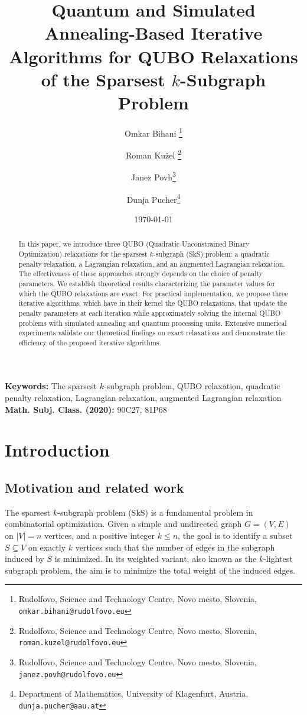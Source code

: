 \documentclass{article}
\title{Quantum and Simulated Annealing-Based Iterative Algorithms for QUBO Relaxations of the  Sparsest 
$k$-Subgraph Problem}
\author{
	{Omkar Bihani} \thanks{Rudolfovo, Science and Technology Centre, Novo mesto, Slovenia, {\tt omkar.bihani@rudolfovo.eu}}
\and
	{Roman Kužel} \thanks{Rudolfovo, Science and Technology Centre, Novo mesto, Slovenia, {\tt roman.kuzel@rudolfovo.eu}}
\and {Janez Povh}\thanks{Rudolfovo, Science and Technology Centre, Novo mesto, Slovenia, {\tt janez.povh@rudolfovo.eu}}
        \and  {Dunja Pucher}\thanks{Department of Mathematics,
		University of Klagenfurt, Austria,
		{\tt dunja.pucher@aau.at} }}
\date{\today}
\begin{document}
\maketitle



\begin{abstract} 
In this paper, we introduce three QUBO (Quadratic Unconstrained Binary Optimization) relaxations for the sparsest 
$k$-subgraph (SkS) problem: a quadratic penalty relaxation, a Lagrangian relaxation, and an augmented Lagrangian relaxation. The effectiveness of these approaches strongly depends on the choice of penalty parameters. We establish theoretical results characterizing the parameter values for which the QUBO relaxations are exact. For practical implementation, we propose three iterative algorithms, which have in their kernel the QUBO relaxations, that update the penalty parameters at each iteration while approximately solving the internal QUBO problems with simulated annealing and quantum processing units. Extensive numerical experiments validate our theoretical findings on exact relaxations and demonstrate the efficiency of the proposed iterative algorithms.    
\end{abstract}

{\small\noindent\textbf{Keywords:} The sparsest $k$-subgraph problem, QUBO relaxation,  quadratic penalty relaxation, Lagrangian relaxation, augmented Lagrangian relaxation}
	\\[1mm]
	{\small\noindent\textbf{Math. Subj. Class. (2020):} 90C27, 81P68}
	
\section{Introduction}

\subsection{Motivation and related work}

The sparsest $k$-subgraph problem (SkS) is a fundamental problem in combinatorial optimization. Given a simple and undirected graph $G = (V, E)$ on $\vert V \vert = n$ vertices, and a positive integer $k \leq n$, the goal is to identify a subset $S \subseteq V$ on exactly $k$ vertices such that the number of edges in the subgraph induced by $S$ is minimized. In its weighted variant, also known as the $k$-lightest subgraph problem, the aim is to minimize the total weight of the induced edges. 
\end{document}
